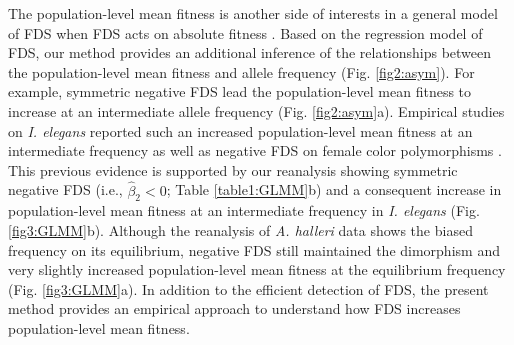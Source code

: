 \documentclass[12pt,]{article}
\begin{document}
The population-level mean fitness is another side of interests in a general model of FDS when FDS acts on absolute fitness \citep{cockerham1972frequency,asmussen_frequency-dependent_1990,schneider_maximization_2008}. Based on the regression model of FDS, our method provides an additional inference of the relationships between the population-level mean fitness and allele frequency (Fig. \ref{fig2:asym}). For example, symmetric negative FDS lead the population-level mean fitness to increase at an intermediate allele frequency (Fig. \ref{fig2:asym}a). Empirical studies on \textit{I. elegans} reported such an increased population-level mean fitness at an intermediate frequency \citep{takahashi2014evolution} as well as negative FDS on female color polymorphisms \citep{le2015evolutionary}. This previous evidence is supported by our reanalysis showing symmetric negative FDS (i.e., $\hat{\beta}_2<0$; Table \ref{table1:GLMM}b) and a consequent increase in population-level mean fitness at an intermediate frequency in \textit{I. elegans} (Fig. \ref{fig3:GLMM}b). Although the reanalysis of \textit{A. halleri} data shows the biased frequency on its equilibrium, negative FDS still maintained the dimorphism and very slightly increased population-level mean fitness at the equilibrium frequency (Fig. \ref{fig3:GLMM}a). In addition to the efficient detection of FDS, the present method provides an empirical approach to understand how FDS increases population-level mean fitness.
\end{document}
